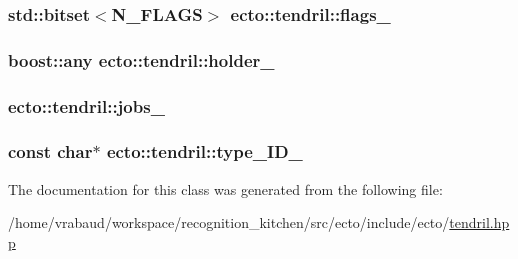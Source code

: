 \subsubsection[{flags\+\_\+}]{\setlength{\rightskip}{0pt plus 5cm}std\+::bitset$<${\bf N\+\_\+\+F\+L\+A\+G\+S}$>$ ecto\+::tendril\+::flags\+\_\+\hspace{0.3cm}{\ttfamily [private]}}\label{classecto_1_1tendril_a7b2a11ba7c80606fafda80d34b0a1bfe}
\hypertarget{classecto_1_1tendril_a8bc7ae1c22c1af9765284666af02868b}{}
\subsubsection[{holder\+\_\+}]{\setlength{\rightskip}{0pt plus 5cm}boost\+::any ecto\+::tendril\+::holder\+\_\+\hspace{0.3cm}{\ttfamily [private]}}\label{classecto_1_1tendril_a8bc7ae1c22c1af9765284666af02868b}
\hypertarget{classecto_1_1tendril_acf171c75c0ace5cd108e8355ee83199c}{}
\subsubsection[{jobs\+\_\+}]{ ecto\+::tendril\+::jobs\+\_\+\hspace{0.3cm}{\ttfamily [private]}}\label{classecto_1_1tendril_acf171c75c0ace5cd108e8355ee83199c}
\hypertarget{classecto_1_1tendril_a5b237bfa0a9acefc48d577b77380058d}{}
\subsubsection[{type\+\_\+\+I\+D\+\_\+}]{\setlength{\rightskip}{0pt plus 5cm}const char$\ast$ ecto\+::tendril\+::type\+\_\+\+I\+D\+\_\+\hspace{0.3cm}{\ttfamily [private]}}\label{classecto_1_1tendril_a5b237bfa0a9acefc48d577b77380058d}


The documentation for this class was generated from the following file\+:\begin{DoxyCompactItemize}
\item 
/home/vrabaud/workspace/recognition\+\_\+kitchen/src/ecto/include/ecto/\hyperlink{tendril_8hpp}{tendril.\+hpp}\end{DoxyCompactItemize}
